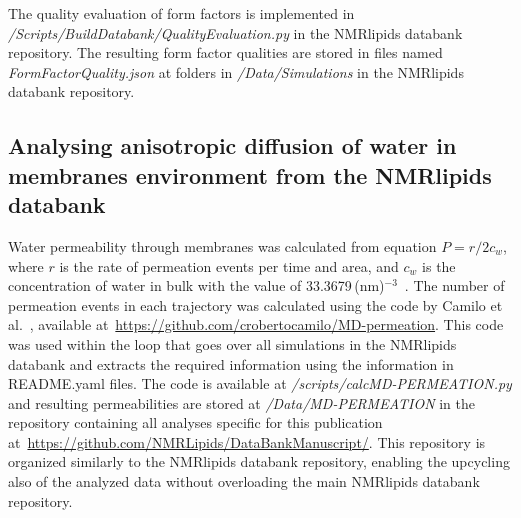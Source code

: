 \documentclass[fleqn,10pt]{wlscirep}
\begin{document}
The quality evaluation of form factors is implemented in {\it /Scripts/BuildDatabank/QualityEvaluation.py} in the NMRlipids databank repository. The resulting form factor qualities are stored in files named {\it FormFactorQuality.json} at folders in {\it /Data/Simulations} in the NMRlipids databank repository.


\subsection{Analysing anisotropic diffusion of water in membranes environment from the NMRlipids databank}



Water permeability through membranes was calculated from equation $P=r/2c_w$, where $r$ is the rate of permeation events per time and area, and $c_w$ is the concentration of water in bulk with the value of 33.3679\,(nm)$^{-3}$~\cite{venable19}. The number of permeation events in each trajectory was calculated using the code by Camilo et al.~\cite{camilo2022}, available at~\url{https://github.com/crobertocamilo/MD-permeation}. This code was used within the loop that goes over all simulations in the NMRlipids databank and extracts the required information using the information in README.yaml files. The code is available at {\it /scripts/calcMD-PERMEATION.py} and resulting permeabilities are stored at {\it /Data/MD-PERMEATION} in the repository containing all analyses specific for this publication at~\url{https://github.com/NMRLipids/DataBankManuscript/}. 
This repository is organized similarly to the NMRlipids databank repository, enabling the upcycling also of the analyzed data without overloading the main NMRlipids databank repository. 
\end{document}
